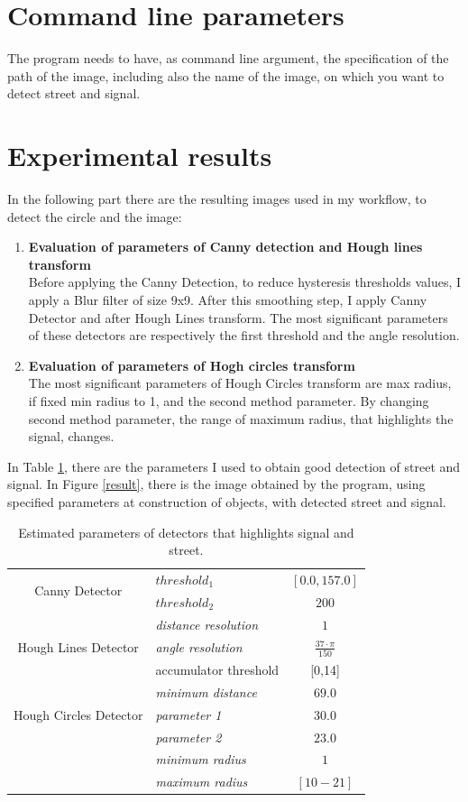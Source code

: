 \documentclass{article}
\begin{document}
\section{Command line parameters}
The program needs to have, as command line argument, the specification of the path of the image, including also the name of the image, on which you want to detect street and signal. 
\section{Experimental results}
In the following part there are the resulting images used in my workflow, to detect the circle and the image:\\
\begin{enumerate}
\item{\textbf{Evaluation of parameters of Canny detection and Hough lines transform}\\
Before applying the Canny Detection, to reduce hysteresis thresholds values, I apply a Blur filter of size 9x9. After this smoothing step, I apply Canny Detector and after Hough Lines transform. The most significant parameters of these detectors are respectively the first threshold and the angle resolution.
}
\item{\textbf{Evaluation of parameters of Hogh circles transform}\\
The most significant parameters of Hough Circles transform are max radius, if fixed min radius to 1, and the second method parameter. By changing second method parameter, the range of maximum radius, that highlights the signal, changes.  
}
\end{enumerate}
In Table \ref{param}, there are the parameters I used to obtain good detection of street and signal. In Figure \ref{result}, there is the image obtained by the program, using specified parameters at construction of objects, with detected street and signal. 
\begin{table}[h]
\centering
\begin{tabular}{|c|l|c|}
\hline
\multirow{2}{*}{Canny Detector}&{$threshold_1$}&{$[0.0, 157.0]$}\\
\cline{2-3}
&{$threshold_2$}&{$200$}\\
\hline
\multirow{3}{*}{Hough Lines Detector}&{\textit{distance resolution}}&{$1$}\\
\cline{2-3}
&{\textit{angle resolution}}&{$\frac{37\cdot \pi}{150}$}\\
\cline{2-3}
&{accumulator threshold}&{[0,14]}\\
\hline
\multirow{3}{*}{Hough Circles Detector}&{\textit{minimum distance}}&{$69.0$}\\
\cline{2-3}
&{\textit{parameter 1}}&{$30.0$}\\
\cline{2-3}
&{\textit{parameter 2}}&{$23.0$}\\
\cline{2-3}
&{\textit{minimum radius}}&{$1$}\\
\cline{2-3}
&{\textit{maximum radius}}&{$[10-21]$}\\
\hline
\end{tabular}
\caption{Estimated parameters of detectors that highlights signal and street.}\label{param}
\end{table}
\end{document}
